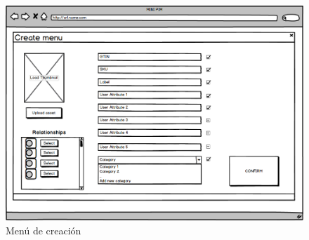 \begin{figure}[H]
    \includegraphics[width=1\linewidth]{mockups/RF2.1_boceto2.png}
    \caption{Menú de creación}
   \end{figure}
\vspace{1.0cm}

\newpage %